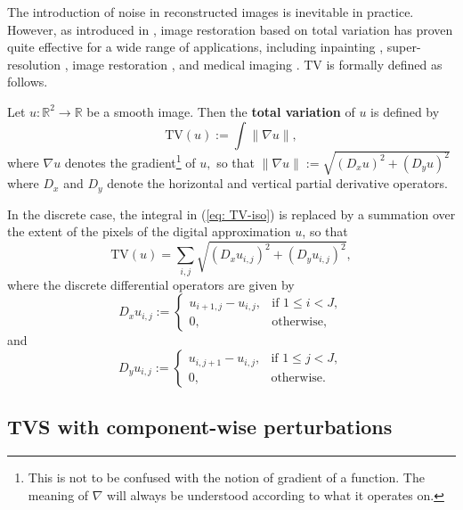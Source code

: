 \documentclass[smallextended]{svjour3}      %
\begin{document}
The introduction of noise in reconstructed images is inevitable in practice. However, as introduced in \cite{rudin1992nonlinear}, image restoration based on total variation has proven quite effective for a wide range of applications, including inpainting \cite{shen2002mathematical}, super-resolution \cite{Marquina2008image}, image restoration \cite{Beck2009FastTVDenoising,wang2008new,Chan05recentdevelopments}, and medical imaging \cite{han2013image,Needell2013StableImage,sidky2008image}. TV is formally defined as follows.
\begin{definition}
	Let $u:\mathbb{R}^{2}\rightarrow\mathbb{R}$ be a smooth image. Then 	the\textbf{ total variation} of $u$ is defined by 	
	\begin{equation}
	\mbox{TV}(u):=\int\|\nabla u\|,\label{eq: TV-iso}
	\end{equation}
	where $\nabla u$ denotes the gradient\footnote{This is not to be confused with the notion of gradient of a function. The meaning of $\nabla$ will always be understood according to what it operates on.} of $u,$ so that $\|\nabla u\|:=\sqrt{(D_{x}u)^{2}+(D_{y}u)^{2}}$ where $D_{x}$ and $D_{y}$ denote the horizontal and vertical partial derivative operators.
\end{definition}
In the discrete case, the integral in (\ref{eq: TV-iso}) is replaced by a summation over the extent of the pixels of the digital approximation
$u$, so that
\begin{equation}
\mbox{TV}(u)=\sum_{i,j}\sqrt{\left(D_{x}u_{i,j}\right)^{2}+\left(D_{y}u_{i,j}\right)^{2}},
\end{equation}
where the discrete differential operators are given by
\begin{equation}
D_{x}u_{i,j}:=\begin{cases}
u_{i+1,j}-u_{i,j}, & \mbox{if }1\leq i<J,\\
0, & \mbox{otherwise,}
\end{cases}\label{eq: D_x-discrete}
\end{equation}
and
\begin{equation}
D_{y}u_{i,j}:=\begin{cases}
u_{i,j+1}-u_{i,j}, & \mbox{if }1\leq j<J,\\
0, & \mbox{otherwise.}
\end{cases}\label{eq: D_y-discrete}
\end{equation}

\subsection{TVS with component-wise perturbations\label{subsec:TVS-with-Coordinate-wise}}
\end{document}
